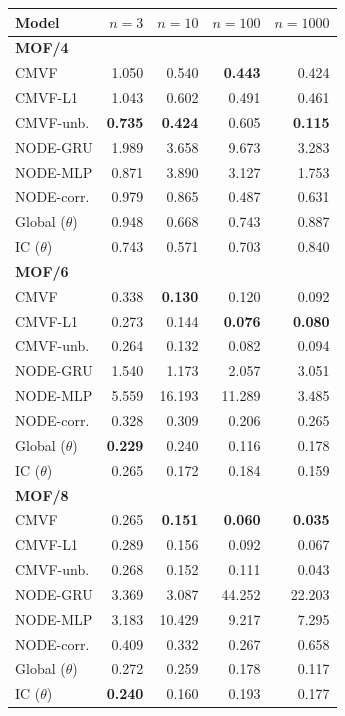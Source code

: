 \begin{tabular*}{\linewidth}{@{\extracolsep{\fill}}lrrrr}
\toprule
Model & $n=3$ & $n=10$ & $n=100$ & $n=1000$ \\
\midrule
\multicolumn{5}{l}{\textbf{MOF/4}} \\
CMVF & 1.050 & 0.540 & \textbf{0.443} & 0.424 \\
CMVF-L1 & 1.043 & 0.602 & 0.491 & 0.461 \\
CMVF-unb. & \textbf{0.735} & \textbf{0.424} & 0.605 & \textbf{0.115} \\
NODE-GRU & 1.989 & 3.658 & 9.673 & 3.283 \\
NODE-MLP & 0.871 & 3.890 & 3.127 & 1.753 \\
NODE-corr. & 0.979 & 0.865 & 0.487 & 0.631 \\
Global ($\theta$) & 0.948 & 0.668 & 0.743 & 0.887 \\
IC ($\theta$) & 0.743 & 0.571 & 0.703 & 0.840 \\
\midrule
\multicolumn{5}{l}{\textbf{MOF/6}} \\
CMVF & 0.338 & \textbf{0.130} & 0.120 & 0.092 \\
CMVF-L1 & 0.273 & 0.144 & \textbf{0.076} & \textbf{0.080} \\
CMVF-unb. & 0.264 & 0.132 & 0.082 & 0.094 \\
NODE-GRU & 1.540 & 1.173 & 2.057 & 3.051 \\
NODE-MLP & 5.559 & 16.193 & 11.289 & 3.485 \\
NODE-corr. & 0.328 & 0.309 & 0.206 & 0.265 \\
Global ($\theta$) & \textbf{0.229} & 0.240 & 0.116 & 0.178 \\
IC ($\theta$) & 0.265 & 0.172 & 0.184 & 0.159 \\
\midrule
\multicolumn{5}{l}{\textbf{MOF/8}} \\
CMVF & 0.265 & \textbf{0.151} & \textbf{0.060} & \textbf{0.035} \\
CMVF-L1 & 0.289 & 0.156 & 0.092 & 0.067 \\
CMVF-unb. & 0.268 & 0.152 & 0.111 & 0.043 \\
NODE-GRU & 3.369 & 3.087 & 44.252 & 22.203 \\
NODE-MLP & 3.183 & 10.429 & 9.217 & 7.295 \\
NODE-corr. & 0.409 & 0.332 & 0.267 & 0.658 \\
Global ($\theta$) & 0.272 & 0.259 & 0.178 & 0.117 \\
IC ($\theta$) & \textbf{0.240} & 0.160 & 0.193 & 0.177 \\

\end{tabular*}
